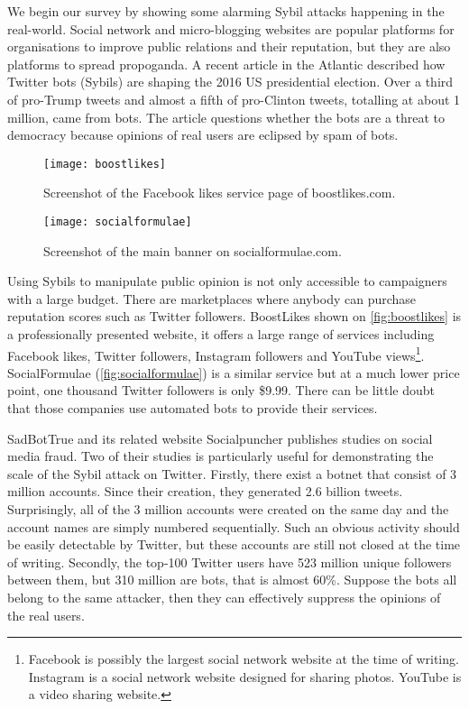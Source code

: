 We begin our survey by showing some alarming Sybil attacks happening in the
real-world. Social network and micro-blogging websites are popular platforms for
organisations to improve public relations and their reputation, but they are
also platforms to spread propoganda. A recent article in the Atlantic described
how Twitter bots (Sybils) are shaping the 2016 US presidential
election\cite{atlantictwitterbots}. Over a third of pro-Trump tweets and almost
a fifth of pro-Clinton tweets, totalling at about 1 million, came from bots. The
article questions whether the bots are a threat to democracy because opinions of
real users are eclipsed by spam of bots.

\begin{figure}
  \centering
  \texttt{[image: boostlikes]}
  \caption{Screenshot of the Facebook likes service page of boostlikes.com.}
  \label{fig:boostlikes}
\end{figure}

\begin{figure*}
  \centering
  \texttt{[image: socialformulae]}
  \caption{Screenshot of the main banner on socialformulae.com.}
  \label{fig:socialformulae}
\end{figure*}

Using Sybils to manipulate public opinion is not only accessible to campaigners
with a large budget. There are marketplaces where anybody can purchase
reputation scores such as Twitter followers. BoostLikes shown on
\autoref{fig:boostlikes} is a professionally presented website, it offers a
large range of services including Facebook likes, Twitter followers, Instagram
followers and YouTube views\footnote{Facebook is possibly the largest social
  network website at the time of writing. Instagram is a social network website
  designed for sharing photos. YouTube is a video sharing website.}.
SocialFormulae (\autoref{fig:socialformulae}) is a similar service but at a much
lower price point, one thousand Twitter followers is only \$9.99. There can be
little doubt that those companies use automated bots to provide their services.

SadBotTrue and its related website Socialpuncher publishes studies on social
media fraud. Two of their studies is particularly useful for demonstrating the
scale of the Sybil attack on Twitter. Firstly, there exist a botnet that consist
of 3 million accounts. Since their creation, they generated 2.6 billion tweets.
Surprisingly, all of the 3 million accounts were created on the same day and the
account names are simply numbered sequentially\cite{sadbottrue}. Such an obvious
activity should be easily detectable by Twitter, but these accounts are still
not closed at the time of writing. Secondly, the top-100 Twitter users have 523
million unique followers between them, but 310 million are bots, that is almost
60\%\cite{socialpuncher}. Suppose the bots all belong to the same attacker, then
they can effectively suppress the opinions of the real users.

